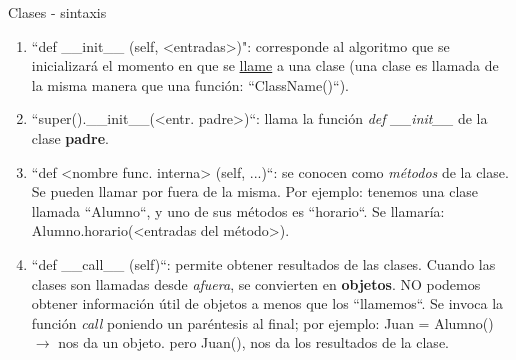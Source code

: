 \begin{frame}[fragile]{Clases - sintaxis}\vspace{0pt}

\begin{enumerate}
	\item ``def \_\_init\_\_ (self, <entradas>)": corresponde al algoritmo que se inicializará el momento en que se \underline{llame} a una clase (una clase es llamada de la misma manera que una función: ``ClassName()``). 
	\item ``super().\_\_init\_\_(<entr. padre>)``: llama la funci\'on \textit{def \_\_init\_\_} de la clase \textbf{padre}.
	\item ``def <nombre func. interna> (self, ...)``: se conocen como \textit{m\'etodos} de la clase. Se pueden llamar por fuera de la misma. Por ejemplo: tenemos una clase llamada ``Alumno``, y uno de sus m\'etodos es ``horario``. Se llamaría: Alumno.horario(<entradas del método>).
	\item ``def \_\_call\_\_ (self)``: permite obtener resultados de las clases. Cuando las clases son llamadas desde \textit{afuera}, se convierten en \textbf{objetos}. NO podemos obtener informaci\'on \'util de objetos a menos que los ``llamemos``. Se invoca la funci\'on \textit{call} poniendo un par\'entesis al final; por ejemplo: Juan = Alumno() $\rightarrow$ nos da un objeto. pero Juan(), nos da los resultados de la clase. 
\end{enumerate}

\end{frame}